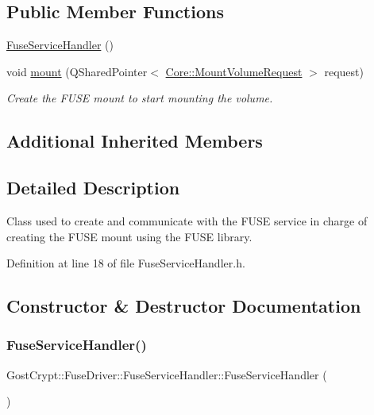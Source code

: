 \subsection*{Public Member Functions}
\begin{DoxyCompactItemize}
\item 
\hyperlink{class_gost_crypt_1_1_fuse_driver_1_1_fuse_service_handler_aba67709c5a66b3e530743d111c277ca0}{Fuse\+Service\+Handler} ()
\item 
void \hyperlink{class_gost_crypt_1_1_fuse_driver_1_1_fuse_service_handler_a6a96ca8fdbbcd35dab5572dde85a764c}{mount} (Q\+Shared\+Pointer$<$ \hyperlink{struct_gost_crypt_1_1_core_1_1_mount_volume_request}{Core\+::\+Mount\+Volume\+Request} $>$ request)
\begin{DoxyCompactList}\small\item\em Create the F\+U\+SE mount to start mounting the volume. \end{DoxyCompactList}\end{DoxyCompactItemize}
\subsection*{Additional Inherited Members}


\subsection{Detailed Description}
Class used to create and communicate with the F\+U\+SE service in charge of creating the F\+U\+SE mount using the F\+U\+SE library. 

Definition at line 18 of file Fuse\+Service\+Handler.\+h.



\subsection{Constructor \& Destructor Documentation}
\mbox{\label{class_gost_crypt_1_1_fuse_driver_1_1_fuse_service_handler_aba67709c5a66b3e530743d111c277ca0}} 
\subsubsection{\texorpdfstring{Fuse\+Service\+Handler()}{FuseServiceHandler()}}
{\footnotesize\ttfamily Gost\+Crypt\+::\+Fuse\+Driver\+::\+Fuse\+Service\+Handler\+::\+Fuse\+Service\+Handler (\begin{DoxyParamCaption}{ }\end{DoxyParamCaption})}



